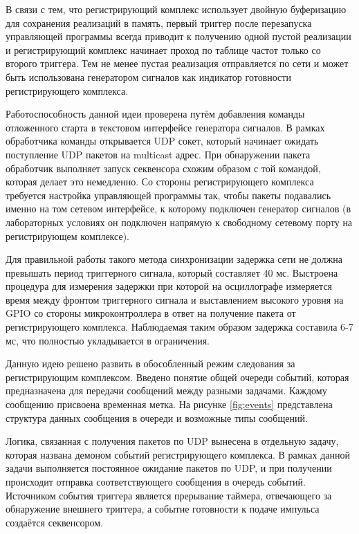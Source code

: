 \documentclass{report}
\begin{document}
В связи с тем, что регистрирующий комплекс использует двойную буферизацию для сохранения реализаций  в память, первый триггер после перезапуска управляющей программы всегда приводит к получению одной пустой реализации и регистрирующий комплекс начинает проход по таблице частот только со второго триггера. Тем не менее пустая реализация отправляется по сети и может быть использована генератором сигналов как индикатор готовности регистрирующего комплекса.

Работоспособность данной идеи проверена путём добавления команды отложенного старта в текстовом интерфейсе генератора сигналов. В рамках обработчика команды открывается UDP сокет, который начинает ожидать поступление UDP пакетов на multicast адрес. При обнаружении пакета обработчик выполняет запуск секвенсора схожим образом с той командой, которая делает это немедленно. Со стороны регистрирующего комплекса требуется настройка управляющей программы так, чтобы пакеты подавались именно на том сетевом интерфейсе, к которому подключен генератор сигналов (в лабораторных условиях он подключен напрямую к свободному сетевому порту на регистрирующем комплексе).

Для правильной работы такого метода синхронизации задержка сети не должна превышать период триггерного сигнала, который составляет 40 мс. Выстроена процедура для измерения задержки при которой на осциллографе измеряется время между фронтом триггерного сигнала и выставлением высокого уровня на GPIO со стороны микроконтроллера в ответ на получение пакета от регистрирующего комплекса. Наблюдаемая таким образом задержка составила 6-7 мс, что полностью укладывается в ограничения.


Данную идею решено развить в обособленный режим следования за регистрирующим комплексом. Введено понятие общей очереди событий, которая предназначена для передачи сообщений между разными задачами. Каждому сообщению присвоена временная метка. На рисунке \ref{fig:events} представлена структура данных сообщения в очереди и возможные типы сообщений.


Логика, связанная с получения пакетов по UDP вынесена в отдельную задачу, которая названа демоном событий регистрирующего комплекса. В рамках данной задачи выполняется постоянное ожидание пакетов по UDP, и при получении происходит отправка соответствующего сообщения в очередь событий. Источником события триггера является прерывание таймера, отвечающего за обнаружение внешнего триггера, а событие готовности к подаче импульса создаётся секвенсором.
\end{document}
